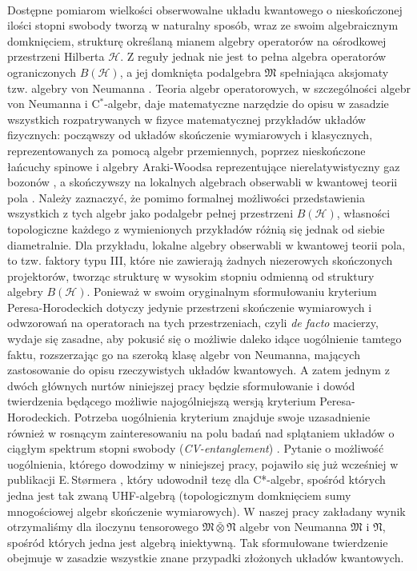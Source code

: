 \paragraph{}
\label{par:intro:02}
Dostępne pomiarom wielkości obserwowalne układu kwantowego o nieskończonej
ilości stopni swobody tworzą w naturalny sposób,
wraz ze swoim algebraicznym domknięciem,
strukturę określaną mianem algebry operatorów na ośrodkowej przestrzeni Hilberta
$\mathcal{H}$.
Z reguły jednak nie jest to pełna algebra operatorów ograniczonych
$B(\mathcal{H})$,
a jej domknięta podalgebra $\mathfrak{M}$ spełniająca aksjomaty tzw.
algebry von Neumanna
\cite{Takesaki1}.
Teoria algebr operatorowych,
w szczególności algebr von Neumanna i \mbox{C$^{*}$-algebr},
daje matematyczne narzędzie do opisu w zasadzie wszystkich rozpatrywanych
w fizyce matematycznej przykładów układów fizycznych:
począwszy od układów skończenie wymiarowych i klasycznych,
reprezentowanych za pomocą algebr przemiennych,
poprzez nieskończone łańcuchy spinowe i algebry Araki-Woodsa reprezentujące
nierelatywistyczny gaz bozonów
\cite{araki1968classification},
a skończywszy na lokalnych algebrach obserwabli w kwantowej teorii pola
\cite{Nielsen2010}.
Należy zaznaczyć,
że pomimo formalnej możliwości przedstawienia wszystkich z tych algebr jako
podalgebr pełnej przestrzeni $B(\mathcal{H})$,
własności topologiczne każdego z wymienionych przykładów
różnią się jednak od siebie diametralnie.
Dla przykładu, lokalne algebry obserwabli w kwantowej teorii pola,
to tzw. faktory typu III,
które nie zawierają żadnych niezerowych skończonych projektorów,
tworząc strukturę w wysokim stopniu odmienną od struktury algebry $B(\mathcal{H})$. 
Ponieważ w swoim oryginalnym sformułowaniu kryterium Peresa-Horodeckich
dotyczy jedynie przestrzeni skończenie wymiarowych i odwzorowań na operatorach
na tych przestrzeniach,
czyli \emph{de facto} macierzy,
wydaje się zasadne,
aby pokusić się o możliwie daleko idące uogólnienie tamtego faktu,
rozszerzając go na szeroką klasę algebr von Neumanna,
mających zastosowanie do opisu rzeczywistych układów kwantowych.
A zatem jednym z dwóch głównych nurtów niniejszej pracy będzie sformułowanie
i dowód twierdzenia będącego możliwie najogólniejszą wersją
kryterium Peresa-Horodeckich.
Potrzeba uogólnienia kryterium znajduje swoje uzasadnienie również 
w rosnącym zainteresowaniu na polu badań nad splątaniem układów o ciągłym
spektrum stopni swobody (\emph{CV-entanglement})
\cite{adesso2007entanglement}.
Pytanie o możliwość uogólnienia, którego dowodzimy w niniejszej pracy,
pojawiło się już wcześniej w publikacji E.\,St{\o}rmera
\cite{stormer2008separable},
który udowodnił tezę dla C*-algebr,
spośród których jedna jest tak zwaną UHF-algebrą 
(topologicznym domknięciem sumy mnogościowej algebr skończenie wymiarowych).
W naszej pracy zakładany wynik otrzymaliśmy dla iloczynu tensorowego
$\mathfrak{M} \bar{\otimes} \mathfrak{N}$ 
algebr von Neumanna $\mathfrak{M}$ i $\mathfrak{N}$,
spośród których jedna jest algebrą iniektywną.
Tak sformułowane twierdzenie obejmuje w zasadzie wszystkie znane
przypadki złożonych układów kwantowych.

